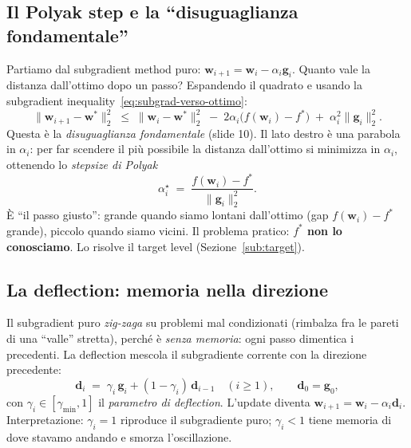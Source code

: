 \documentclass[11pt,a4paper]{article}
\theoremstyle{definition}
\newcommand{\w}{\bm{w}}
\newcommand{\g}{\bm{g}}
\newcommand{\dvec}{\bm{d}}
\newcommand{\wstar}{\w^{*}}
\newcommand{\fstar}{f^{*}}
\newcommand{\gmin}{\gamma_{\min}}
\newcommand{\norm}[1]{\lVert #1\rVert}
\begin{document}
\subsection{Il Polyak step e la ``disuguaglianza fondamentale''}
\label{sub:polyak}

Partiamo dal subgradient method puro: $\w_{i+1}=\w_i-\alpha_i\g_i$. Quanto vale la distanza
dall'ottimo dopo un passo? Espandendo il quadrato e usando la
subgradient inequality~\eqref{eq:subgrad-verso-ottimo}:
\begin{equation}\label{eq:fundamental}
\norm{\w_{i+1}-\wstar}_2^2
\;\le\; \norm{\w_i-\wstar}_2^2 \;-\; 2\alpha_i\big(f(\w_i)-\fstar\big) \;+\; \alpha_i^2\norm{\g_i}_2^2 .
\end{equation}
Questa è la \emph{disuguaglianza fondamentale} (slide 10). Il lato destro è una parabola in
$\alpha_i$: per far scendere il più possibile la distanza dall'ottimo si minimizza in
$\alpha_i$, ottenendo lo \emph{stepsize di Polyak}
\begin{equation}\label{eq:polyak-step}
\alpha_i^\star \;=\; \frac{f(\w_i)-\fstar}{\norm{\g_i}_2^2}.
\end{equation}
È ``il passo giusto'': grande quando siamo lontani dall'ottimo (gap $f(\w_i)-\fstar$ grande),
piccolo quando siamo vicini. Il problema pratico: \textbf{$\fstar$ non lo conosciamo}. Lo
risolve il target level (Sezione~\ref{sub:target}).

\subsection{La deflection: memoria nella direzione}
\label{sub:deflection}

Il subgradient puro \emph{zig-zaga} su problemi mal condizionati (rimbalza fra le pareti di
una ``valle'' stretta), perché è \emph{senza memoria}: ogni passo dimentica i precedenti. La
deflection mescola il subgradiente corrente con la direzione precedente:
\begin{equation}\label{eq:deflected}
\dvec_i \;=\; \gamma_i\,\g_i + (1-\gamma_i)\,\dvec_{i-1}\quad(i\ge1),\qquad \dvec_0=\g_0,
\end{equation}
con $\gamma_i\in[\gmin,1]$ il \emph{parametro di deflection}. L'update diventa
$\w_{i+1}=\w_i-\alpha_i\dvec_i$. Interpretazione: $\gamma_i=1$ riproduce il subgradiente puro;
$\gamma_i<1$ tiene memoria di dove stavamo andando e smorza l'oscillazione.
\end{document}
